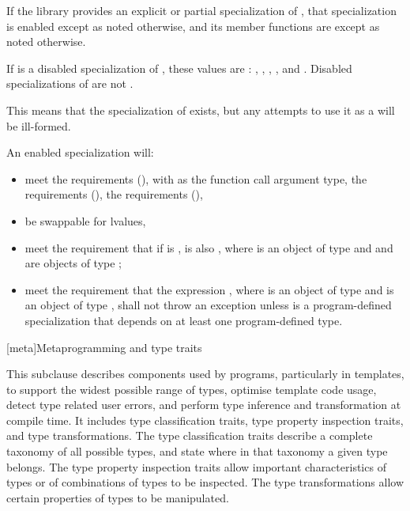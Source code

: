 \pnum
If the library provides an explicit or partial specialization of ,
that specialization is enabled except as noted otherwise,
and its member functions are  except as noted otherwise.

\pnum
If  is a disabled specialization of ,
these values are :
,
,
,
, and
.
Disabled specializations of 
are not .
\begin{note}
This means that the specialization of  exists, but
any attempts to use it as a  will be ill-formed.
\end{note}

\pnum
An enabled specialization  will:
\begin{itemize}
\item meet the  requirements (),
with  as the function
call argument type, the  requirements (),
the  requirements (),
\item be swappable for lvalues,
\item meet the requirement that if  is ,  is
also , where  is an object of type  and  and 
are objects of type ;
\item meet the requirement that the expression , where 
is an object of type  and  is an object of type
, shall not throw an exception unless  is a
program-defined specialization that depends on at least one program-defined type.
\end{itemize}

[meta]{Metaprogramming and type traits}

\pnum
This subclause describes components used by \Cpp{} programs, particularly in
templates, to support the widest possible range of types, optimise
template code usage, detect type related user errors, and perform
type inference and transformation at compile time. It includes type
classification traits, type property inspection traits, and type
transformations. The type classification traits describe a complete taxonomy
of all possible \Cpp{} types, and state where in that taxonomy a given
type belongs. The type property inspection traits allow important
characteristics of types or of combinations of types to be inspected. The
type transformations allow certain properties of types to be manipulated.

